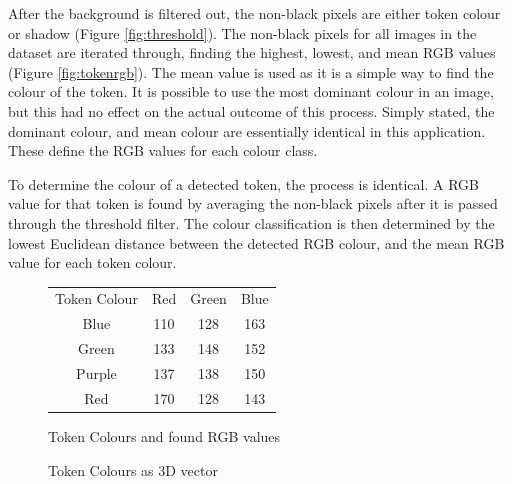 \documentclass[12pt]{article}
\begin{document}
After the background is filtered out, the non-black pixels are either token colour or shadow (Figure \ref{fig:threshold}). 
The non-black pixels for all images in the dataset are iterated through, finding the highest, lowest, and mean RGB values (Figure \ref{fig:tokenrgb}). 
The mean value is used as it is a simple way to find the colour of the token. It is possible to use the most dominant colour in an image, but this had no effect on the actual outcome of this process. 
Simply stated, the dominant colour, and mean colour are essentially identical in this application. 
These define the RGB values for each colour class. 

To determine the colour of a detected token, the process is identical.
A RGB value for that token is found by averaging the non-black pixels after it is passed through the threshold filter. 
The colour classification is then determined by the lowest Euclidean distance between the detected RGB colour, and the mean RGB value for each token colour. 

\begin{figure}[h]
    \centering
    \begin{tabular}{ c c c c }
        Token Colour & Red & Green & Blue \\
        Blue & 110 & 128 & 163 \\
        Green & 133 & 148 & 152 \\
        Purple & 137 & 138 & 150 \\
        Red & 170 & 128 & 143
    \end{tabular}
    \caption{Token Colours and found RGB values}
    \label{fig:tokenrgbtable}
\end{figure}
\begin{figure}[h]
    \centering
    \caption{Token Colours as 3D vector}
    \label{fig:tokenrgbplot}
\end{figure}
\end{document}
